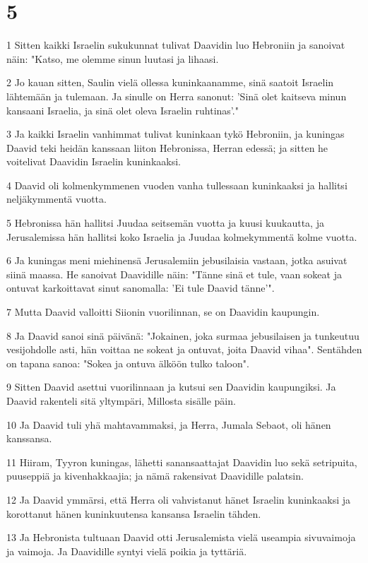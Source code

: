 \chapter{5}

\par 1 Sitten kaikki Israelin sukukunnat tulivat Daavidin luo Hebroniin ja sanoivat näin: "Katso, me olemme sinun luutasi ja lihaasi.
\par 2 Jo kauan sitten, Saulin vielä ollessa kuninkaanamme, sinä saatoit Israelin lähtemään ja tulemaan. Ja sinulle on Herra sanonut: 'Sinä olet kaitseva minun kansaani Israelia, ja sinä olet oleva Israelin ruhtinas'."
\par 3 Ja kaikki Israelin vanhimmat tulivat kuninkaan tykö Hebroniin, ja kuningas Daavid teki heidän kanssaan liiton Hebronissa, Herran edessä; ja sitten he voitelivat Daavidin Israelin kuninkaaksi.
\par 4 Daavid oli kolmenkymmenen vuoden vanha tullessaan kuninkaaksi ja hallitsi neljäkymmentä vuotta.
\par 5 Hebronissa hän hallitsi Juudaa seitsemän vuotta ja kuusi kuukautta, ja Jerusalemissa hän hallitsi koko Israelia ja Juudaa kolmekymmentä kolme vuotta.
\par 6 Ja kuningas meni miehinensä Jerusalemiin jebusilaisia vastaan, jotka asuivat siinä maassa. He sanoivat Daavidille näin: "Tänne sinä et tule, vaan sokeat ja ontuvat karkoittavat sinut sanomalla: 'Ei tule Daavid tänne'".
\par 7 Mutta Daavid valloitti Siionin vuorilinnan, se on Daavidin kaupungin.
\par 8 Ja Daavid sanoi sinä päivänä: "Jokainen, joka surmaa jebusilaisen ja tunkeutuu vesijohdolle asti, hän voittaa ne sokeat ja ontuvat, joita Daavid vihaa". Sentähden on tapana sanoa: "Sokea ja ontuva älköön tulko taloon".
\par 9 Sitten Daavid asettui vuorilinnaan ja kutsui sen Daavidin kaupungiksi. Ja Daavid rakenteli sitä yltympäri, Millosta sisälle päin.
\par 10 Ja Daavid tuli yhä mahtavammaksi, ja Herra, Jumala Sebaot, oli hänen kanssansa.
\par 11 Hiiram, Tyyron kuningas, lähetti sanansaattajat Daavidin luo sekä setripuita, puuseppiä ja kivenhakkaajia; ja nämä rakensivat Daavidille palatsin.
\par 12 Ja Daavid ymmärsi, että Herra oli vahvistanut hänet Israelin kuninkaaksi ja korottanut hänen kuninkuutensa kansansa Israelin tähden.
\par 13 Ja Hebronista tultuaan Daavid otti Jerusalemista vielä useampia sivuvaimoja ja vaimoja. Ja Daavidille syntyi vielä poikia ja tyttäriä.
